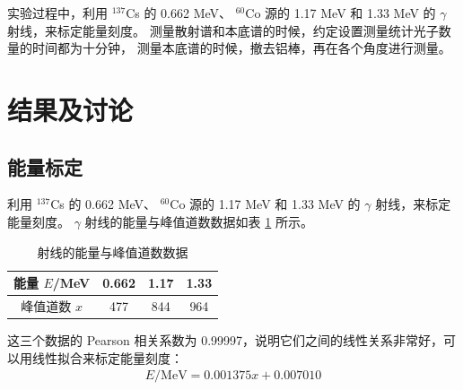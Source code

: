 \documentclass[revtex4-2]{mpltx}
\begin{document}
实验过程中，利用 ${}^{137}$Cs 的 0.662 MeV、 ${}^{60}$Co 源的 1.17 MeV 和 1.33 MeV 的 $\gamma$ 射线，来标定能量刻度。
测量散射谱和本底谱的时候，约定设置测量统计光子数量的时间都为十分钟，
测量本底谱的时候，撤去铝棒，再在各个角度进行测量。

\section{结果及讨论}
\subsection{能量标定}
利用 ${}^{137}$Cs 的 0.662 MeV、 ${}^{60}$Co 源的 1.17 MeV 和 1.33 MeV 的 $\gamma$ 射线，来标定能量刻度。 $\gamma$ 射线的能量与峰值道数数据如表 \ref{tab:1} 所示。
\begin{table}[htbp]
    \centering
    \caption{射线的能量与峰值道数数据}
    \label{tab:1}
    \begin{tabular}{cccc}
        \hline
        能量 $E$/MeV & 0.662 & 1.17 & 1.33 \\
        \hline
        峰值道数 $x$ & 477 & 844 & 964 \\
        \hline
    \end{tabular}
\end{table}

这三个数据的 Pearson 相关系数为 0.99997，说明它们之间的线性关系非常好，可以用线性拟合来标定能量刻度：
\begin{align}
    \label{eq:2}E\mathrm{/MeV}=0.001375 x +  0.007010
\end{align}
\end{document}
